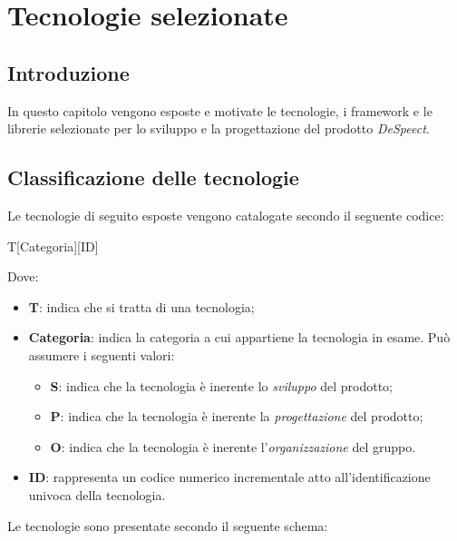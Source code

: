 \documentclass[./../Technology Baseline.tex]{subfiles}
\begin{document}
	
\chapter{Tecnologie selezionate}
	
\section{Introduzione}
In questo capitolo vengono esposte e motivate le tecnologie, i framework e le librerie selezionate per lo sviluppo e la progettazione del prodotto \textit{DeSpeect}.

\section{Classificazione delle tecnologie}

Le tecnologie di seguito esposte vengono catalogate secondo il seguente codice:

\begin{center}
	T[Categoria][ID]
\end{center}

Dove:

\begin{itemize}
	\item \textbf{T}: indica che si tratta di una tecnologia;
	\item \textbf{Categoria}: indica la categoria a cui appartiene la tecnologia in esame. Può assumere i seguenti valori:
		\begin{itemize}
			\item \textbf{S}: indica che la tecnologia è inerente lo \textit{sviluppo} del prodotto;
			\item \textbf{P}: indica che la tecnologia è inerente la \textit{progettazione} del prodotto;
			\item \textbf{O}: indica che la tecnologia è inerente l'\textit{organizzazione} del gruppo.
		\end{itemize}
	\item \textbf{ID}: rappresenta un codice numerico incrementale atto all'identificazione univoca della tecnologia.
\end{itemize}

\noindent Le tecnologie sono presentate secondo il seguente schema: 
\end{document}
